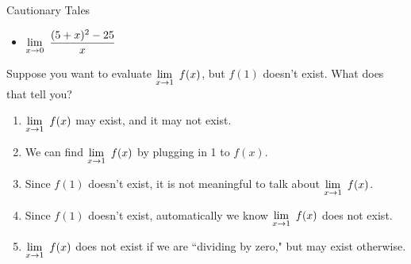 \begin{frame}[t]{Cautionary Tales}
\begin{itemize}
\item$\displaystyle\lim_{x \to 0}~\frac{(5+x)^2-25}{x}$
\vfill
{}
\vfill
{}
\vfill
{}
\end{itemize}\vfill\end{frame}
 \begin{frame}
Suppose you want to evaluate $\displaystyle\lim_{x \to 1}~ f(x)$, but $f(1)$ doesn't exist. What does that tell you?\vfill\vfill 
\begin{enumerate}[ A]
\item\alert<2|handout:0>{$\displaystyle\lim_{x \to 1}~ f(x)$ may exist, and it may not exist. }\vfill
\item We can find $\displaystyle\lim_{x \to 1}~ f(x)$ by plugging in 1 to $f(x)$.\vfill
\item Since $f(1)$ doesn't exist, it is not meaningful to talk about $\displaystyle\lim_{x \to 1}~ f(x)$.\vfill
\item Since $f(1)$ doesn't exist, automatically we know $\displaystyle\lim_{x \to 1}~f(x)$ does not exist.\vfill
\item $\displaystyle\lim_{x \to 1}~ f(x)$ does not exist if we are ``dividing by zero," but may exist otherwise.\vfill
\end{enumerate}
 \end{frame}
